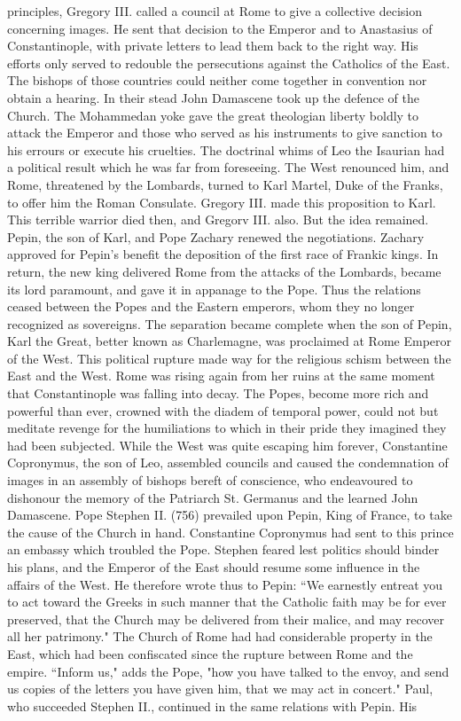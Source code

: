 principles, Gregory III. called a council at Rome to give a collective decision concerning images. He sent that decision to the Emperor and to Anastasius of Constantinople, with private letters to lead them back to the right way. His efforts only served to redouble the persecutions against the Catholics of the East. The bishops of those countries could neither come together in convention nor obtain a hearing. In their stead John Damascene took up the defence of the Church. The Mohammedan yoke gave the great theologian liberty boldly to attack the Emperor and those who served as his instruments to give sanction to his errours or execute his cruelties. The doctrinal whims of Leo the Isaurian had a political result which he was far from foreseeing. The West renounced him, and Rome, threatened by the Lombards, turned to Karl Martel, Duke of the Franks, to offer him the Roman Consulate. Gregory III. made this proposition to Karl. This terrible warrior died then, and Gregorv III. also. But the idea remained. Pepin, the son of Karl, and Pope Zachary renewed the negotiations. Zachary approved for Pepin's benefit the deposition of the first race of Frankic kings. In return, the new king delivered Rome from the attacks of the Lombards, became its lord paramount, and gave it in appanage to the Pope. Thus the relations ceased between the Popes and the Eastern emperors, whom they no longer recognized as sovereigns. The separation became complete when the son of Pepin, Karl the Great, better known as Charlemagne, was proclaimed at Rome Emperor of the West. This political rupture made way for the religious schism between the East and the West. Rome was rising again from her ruins at the same moment that Constantinople was falling into decay. The Popes, become more rich and powerful than ever, crowned with the diadem of temporal power, could not but meditate revenge for the humiliations to which in their pride they imagined they had been subjected. While the West was quite escaping him forever, Constantine Copronymus, the son of Leo, assembled councils and caused the condemnation of images in an assembly of bishops bereft of conscience, who endeavoured to dishonour the memory of the Patriarch St. Germanus and the learned John Damascene. Pope Stephen II. (756) prevailed upon Pepin, King of France, to take the cause of the Church in hand. Constantine Copronymus had sent to this prince an embassy which troubled the Pope. Stephen feared lest politics should binder his plans, and the Emperor of the East should resume some influence in the affairs of the West. He therefore wrote thus to Pepin: “We earnestly entreat you to act toward the Greeks in such manner that the Catholic faith may be for ever preserved, that the Church may be delivered from their malice, and may recover all her patrimony." The Church of Rome had had considerable property in the East, which had been confiscated since the rupture between Rome and the empire. “Inform us," adds the Pope, "how you have talked to the envoy, and send us copies of the letters you have given him, that we may act in concert." Paul, who succeeded Stephen II., continued in the same relations with Pepin. His

